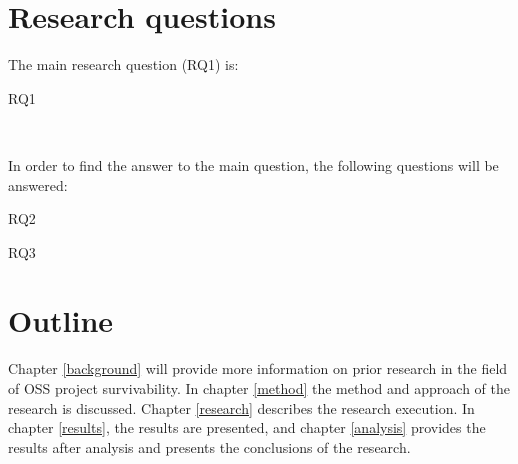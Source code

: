 % 

\section{Research questions}
\label{questions}

The main research question (RQ1) is:\\

\begin{description}
	\item[RQ1] \emph{\researchQuestion}\\[0.3cm]
\end{description}

\noindent
In order to find the answer to the main question, the following
questions will be answered:
\begin{description}
	\item[RQ2] \emph{\subQuestionOne}
	\item[RQ3] \emph{\subQuestionTwo}
\end{description}

\section{Outline}

Chapter \ref{background} will provide more information on prior research in the
field of OSS project survivability. In chapter \ref{method} the method and
approach of the research is discussed. Chapter \ref{research} describes the
research execution. In chapter \ref{results}, the results are presented, and
chapter \ref{analysis} provides the results after analysis and presents the
conclusions of the research.

